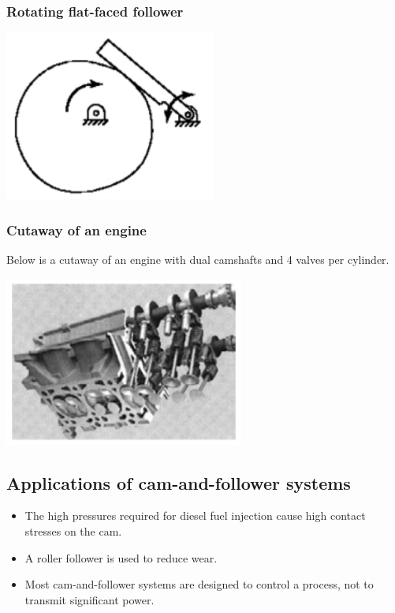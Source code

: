 \documentclass[11pt]{article}
\begin{document}
\subsubsection{Rotating flat-faced follower}
\label{sec:orgc4a1736}
\begin{center}
\includegraphics[height=15em]{./images/rotating-flat-faced-follower.png}
\end{center}
\subsubsection{Cutaway of an engine}
\label{sec:org3d47937}
Below is a cutaway of an engine with dual camshafts and 4 valves per cylinder.
\begin{center}
\includegraphics[height=15em]{./images/cutaway-of-an-engine.png}
\end{center}
\subsection{Applications of cam-and-follower systems}
\label{sec:org2fdf921}
\begin{itemize}
\item The high pressures required for diesel fuel injection cause high contact stresses on the cam.
\item A roller follower is used to reduce wear.
\item Most cam-and-follower systems are designed to control a process, not to transmit significant power.
\end{itemize}
\end{document}
